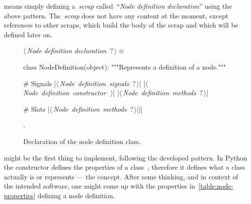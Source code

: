 \documentclass[%
    a4paper,    %
    justified,  %
    nobib,      %
    openany     %
]{tufte-book}
\makeatletter
\renewcommand{\label}[1]{\@tufte@label{##1}}%
\makeatother
\begin{document}
\newpage{}

 means simply defining a~\emph{scrap}
called~\enquote{\emph{Node definition declaration}} using the above pattern.
The~\emph{scrap} does not have any content at the moment, except references to
other scraps, which build the body of the scrap and which will be defined later
on.

\begin{figure}[h]
  \begin{flushleft} \small
\begin{minipage}{\linewidth}\label{scrap1}\raggedright\small
{} $\langle\,${\itshape Node definition declaration}\nobreak\ {\footnotesize {?}}$\,\rangle\equiv$
\vspace{-1ex}
\begin{pythoncode}
class NodeDefinition(object):
    """Represents a definition of a node."""

    # Signals
    |\hbox{$\langle\,${\itshape Node definition signals}\nobreak\ {\footnotesize ?}$\,\rangle$}|
    |\hbox{$\langle\,${\itshape Node definition constructor}\nobreak\ {\footnotesize {}}$\,\rangle$}|
    |\hbox{$\langle\,${\itshape Node definition methods}\nobreak\ {\footnotesize ?}$\,\rangle$}|

    # Slots
    |\hbox{$\langle\,${\itshape Node definition methods}\nobreak\ {\footnotesize ?}$\,\rangle$}||\NWsep|
\end{pythoncode}
\vspace{1.5ex}
\footnotesize
\begin{list}{}{\setlength{\itemsep}{-\parsep}\setlength{\itemindent}{-\leftmargin}}
\item {\NWtxtMacroNoRef}.

\item{}
\end{list}
\end{minipage}\vspace{4ex}
\end{flushleft}
\caption{Declaration of the node definition class.}
  \label{lst:node-def-class-decl}
\end{figure}

 might be the first thing to implement, following
the developed pattern. In Python the constructor defines the properties of a
class~, therefore it defines what a class
actually is or represents --- the concept. After some thinking, and in context
of the intended software, one might come up with the properties
in~\autoref{table:node-properties} defining a node definition.
\end{document}
